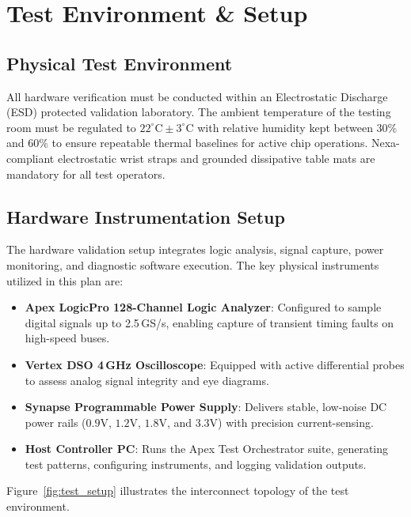 \section{Test Environment \& Setup}

\subsection{Physical Test Environment}
All hardware verification must be conducted within an Electrostatic Discharge (ESD) protected validation laboratory. The ambient temperature of the testing room must be regulated to $22^\circ\text{C} \pm 3^\circ\text{C}$ with relative humidity kept between $30\%$ and $60\%$ to ensure repeatable thermal baselines for active chip operations. Nexa-compliant electrostatic wrist straps and grounded dissipative table mats are mandatory for all test operators.

\subsection{Hardware Instrumentation Setup}
The hardware validation setup integrates logic analysis, signal capture, power monitoring, and diagnostic software execution. The key physical instruments utilized in this plan are:
\begin{itemize}
    \item \textbf{Apex LogicPro 128-Channel Logic Analyzer}: Configured to sample digital signals up to 2.5\,GS/s, enabling capture of transient timing faults on high-speed buses.
    \item \textbf{Vertex DSO 4\,GHz Oscilloscope}: Equipped with active differential probes to assess analog signal integrity and eye diagrams.
    \item \textbf{Synapse Programmable Power Supply}: Delivers stable, low-noise DC power rails ($0.9\text{V}$, $1.2\text{V}$, $1.8\text{V}$, and $3.3\text{V}$) with precision current-sensing.
    \item \textbf{Host Controller PC}: Runs the Apex Test Orchestrator suite, generating test patterns, configuring instruments, and logging validation outputs.
\end{itemize}

Figure~\ref{fig:test_setup} illustrates the interconnect topology of the test environment.

